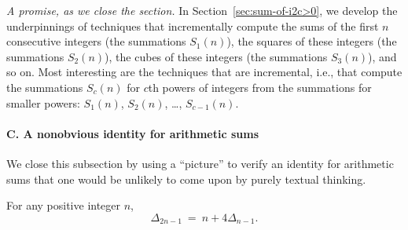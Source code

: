 %

\bigskip

{\it A promise, as we close the section.}
%
In Section~\ref{sec:sum-of-i2c>0}, we develop the underpinnings of
techniques that incrementally compute the sums of the first $n$
consecutive integers (the summations $S_1(n)$), the squares of these
integers (the summations $S_2(n)$), the cubes of these integers (the
summations $S_3(n)$), and so on.  Most interesting are the
techniques that are incremental, i.e., that compute the summations
$S_c(n)$ for $c$th powers of integers from the summations for
smaller powers: $S_1(n)$, $S_2(n)$, \ldots, $S_{c-1}(n)$.

\bigskip

\paragraph{\sf C. A nonobvious identity for arithmetic sums}
%
We close this subsection by using a ``picture'' to verify an identity for
arithmetic sums that one would be unlikely to come upon by purely
textual thinking.

\begin{prop} 
\label{thm:an-arithmetic-identity}
For any positive integer $n$,
\[ \Delta_{2n-1} \ = \ n + 4 \Delta_{n-1}. \]
\end{prop} 

